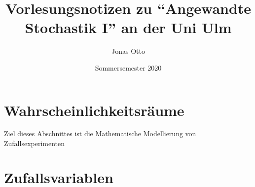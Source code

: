 \documentclass[a4paper]{report}
\author{Jonas Otto}
\title{Vorlesungsnotizen zu \enquote{Angewandte Stochastik I} an der Uni Ulm}
\date{Sommersemester 2020}
\theoremstyle{definition}
\begin{document}
\maketitle

\tableofcontents



\chapter{Wahrscheinlichkeitsräume}
Ziel dieses Abschnittes ist die Mathematische Modellierung von Zufallsexperimenten












\chapter{Zufallsvariablen}

\end{document}
